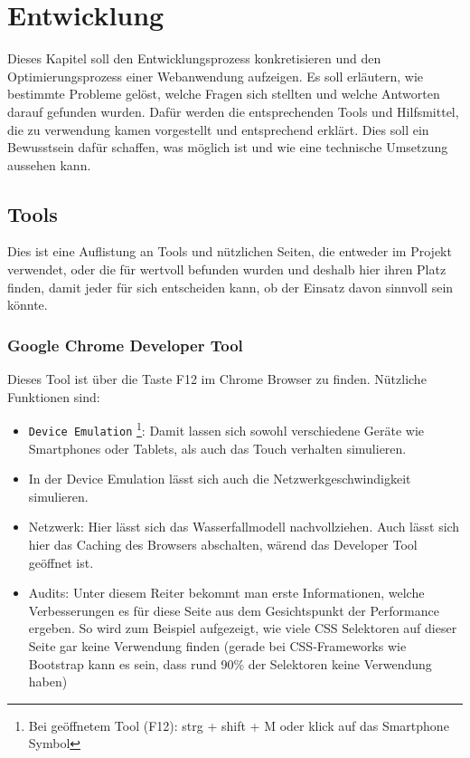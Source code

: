 \section{Entwicklung} %
\label{sec:entwicklung}
	Dieses Kapitel soll den Entwicklungsprozess konkretisieren und den Optimierungsprozess einer Webanwendung aufzeigen. Es soll erläutern, wie bestimmte Probleme gelöst, welche Fragen sich stellten und welche Antworten darauf gefunden wurden. Dafür werden die entsprechenden Tools und Hilfsmittel, die zu verwendung kamen vorgestellt und entsprechend erklärt. Dies soll ein Bewusstsein dafür schaffen, was möglich ist und wie eine technische Umsetzung aussehen kann.
	
	\subsection{Tools}
	\label{sub:tools}
		Dies ist eine Auflistung an Tools und nützlichen Seiten, die entweder im Projekt verwendet, oder die für wertvoll befunden wurden und deshalb hier ihren Platz finden, damit jeder für sich entscheiden kann, ob der Einsatz davon sinnvoll sein könnte.

		\subsubsection{Google Chrome Developer Tool} %
		\label{ssub:google_chrome_developertool}
			Dieses Tool ist über die Taste F12 im Chrome Browser zu finden. Nützliche Funktionen sind: 

			\begin{itemize}
				\item \texttt{Device Emulation} \footnote{Bei geöffnetem Tool (F12): strg + shift + M oder klick auf das Smartphone Symbol}: Damit lassen sich sowohl verschiedene Geräte wie Smartphones oder Tablets, als auch das Touch verhalten simulieren.

				\item In der Device Emulation lässt sich auch die Netzwerkgeschwindigkeit simulieren.

				\item Netzwerk: Hier lässt sich das Wasserfallmodell nachvollziehen. Auch lässt sich hier das Caching des Browsers abschalten, wärend das Developer Tool geöffnet ist.

				\item Audits: Unter diesem Reiter bekommt man erste Informationen, welche Verbesserungen es für diese Seite aus dem Gesichtspunkt der Performance ergeben. So wird zum Beispiel aufgezeigt, wie viele CSS Selektoren auf dieser Seite gar keine Verwendung finden (gerade bei CSS-Frameworks wie Bootstrap kann es sein, dass rund 90\% der Selektoren keine Verwendung haben)
			\end{itemize}

